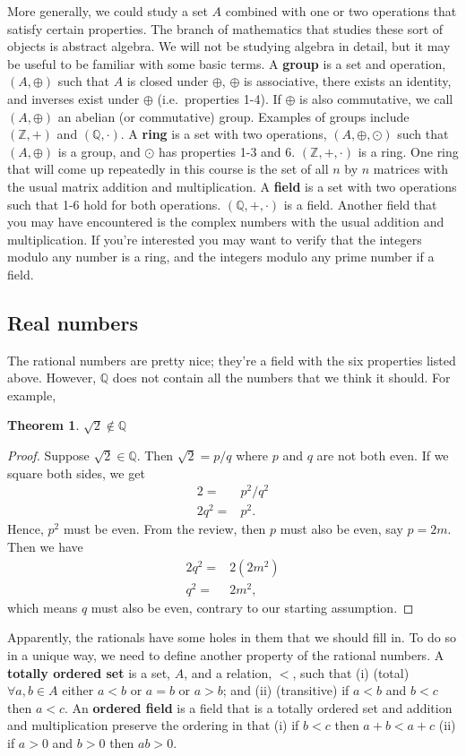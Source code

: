 \documentclass[12pt,reqno]{amsart}
\newtheorem{theorem}{Theorem}[section]
\theoremstyle{definition}
\begin{document}
More generally, we could study a set $A$ combined with one or two
operations that satisfy certain properties. The branch of mathematics
that studies these sort of objects is abstract algebra. We will not be
studying algebra in detail, but it may be useful to be familiar with
some basic terms. A \textbf{group} is a set and operation,
$(A,\oplus)$ such that $A$ is closed under $\oplus$, $\oplus$ is
associative, there exists an identity, and inverses exist under
$\oplus$ (i.e.\ properties 1-4). If $\oplus$ is also commutative, we
call $(A,\oplus)$ an abelian (or commutative) group. Examples of
groups include $(\mathbb{Z},+)$ and $(\mathbb{Q},\cdot)$. A
\textbf{ring} is a set with two operations, $(A,\oplus,\odot)$ such
that $(A,\oplus)$ is a group, and $\odot$ has properties 1-3 and
6. $(\mathbb{Z},+,\cdot)$ is a ring.  One ring that will come up
repeatedly in this course is the set of all $n$ by $n$ matrices with
the usual matrix addition and multiplication. A \textbf{field} is a set
with two operations such that 1-6 hold for both
operations. $(\mathbb{Q},+,\cdot)$ is a field. Another field that you
may have encountered is the complex numbers with the usual addition
and multiplication. If you're interested you may want to verify that
the integers modulo any number is a ring, and the integers modulo any
prime number if a field.

\subsection{Real numbers}

The rational numbers are pretty nice; they're a field with the six
properties listed above. However, $\mathbb{Q}$ does not contain all
the numbers that we think it should. For example,
\begin{theorem}
  $\sqrt{2} \not\in \mathbb{Q}$
\end{theorem}
\begin{proof}
  Suppose $\sqrt{2} \in \mathbb{Q}$. Then $\sqrt{2} = p / q$ where $p$
  and $q$ are not both even. If we square both sides, we get
  \begin{align*}
    2 = & p^2 / q^2 \\
    2 q^2 = & p^2.
  \end{align*}
  Hence, $p^2$ must be even. From the review, then $p$ must also be
  even, say $p = 2m$. Then we have
  \begin{align*}
    2 q^2 = & 2(2 m^2) \\
    q^2 = & 2 m^2,
  \end{align*}
  which means $q$ must also be even, contrary to our starting
  assumption. 
\end{proof}
Apparently, the rationals have some holes in them that we should fill
in. To do so in a unique way, we need to define another property of
the rational numbers. A \textbf{totally ordered set} is a set, $A$,
and a relation, $<$, such that (i) (total) $\forall a,b \in A$ either
$a < b$ or $a = b$ or $a > b$; and (ii) (transitive) if $a < b$ and $b
< c$ then $a < c$. An \textbf{ordered field} is a field that is a
totally ordered set and addition and multiplication preserve the
ordering in that (i) if $b<c$ then $a + b < a + c$ (ii) if $a>0$ and
$b>0$ then $ab>0$.
\end{document}
